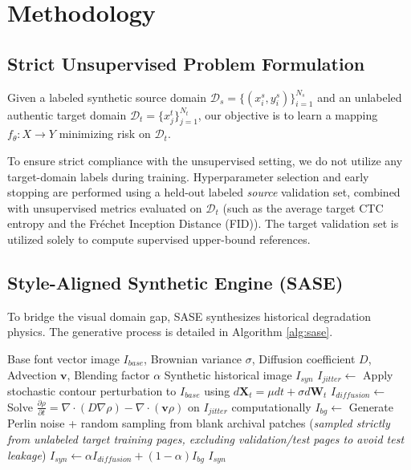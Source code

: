 \documentclass[11pt]{article}
\begin{document}
\section{Methodology}

\subsection{Strict Unsupervised Problem Formulation}
Given a labeled synthetic source domain $\mathcal{D}_s = \{(x_i^s, y_i^s)\}_{i=1}^{N_s}$ and an unlabeled authentic target domain $\mathcal{D}_t = \{x_j^t\}_{j=1}^{N_t}$, our objective is to learn a mapping $f_{\theta}: X \rightarrow Y$ minimizing risk on $\mathcal{D}_t$. 

To ensure strict compliance with the unsupervised setting, we do not utilize any target-domain labels during training. Hyperparameter selection and early stopping are performed using a held-out labeled \textit{source} validation set, combined with unsupervised metrics evaluated on $\mathcal{D}_t$ (such as the average target CTC entropy and the Fr\'echet Inception Distance (FID)). The target validation set is utilized solely to compute supervised upper-bound references.

\subsection{Style-Aligned Synthetic Engine (SASE)}
To bridge the visual domain gap, SASE synthesizes historical degradation physics. The generative process is detailed in Algorithm \ref{alg:sase}.

\begin{algorithm}[h]
\caption{SASE: Physics-Based Data Generation}
\label{alg:sase}
\begin{algorithmic}[1]
\Require Base font vector image $I_{base}$, Brownian variance $\sigma$, Diffusion coefficient $D$, Advection $\mathbf{v}$, Blending factor $\alpha$
\Ensure Synthetic historical image $I_{syn}$
\State $I_{jitter} \leftarrow$ Apply stochastic contour perturbation to $I_{base}$ using $d\mathbf{X}_t = \mu dt + \sigma d\mathbf{W}_t$
\State $I_{diffusion} \leftarrow$ Solve $\frac{\partial \rho}{\partial t} = \nabla \cdot (D \nabla \rho) - \nabla \cdot (\mathbf{v} \rho)$ on $I_{jitter}$ computationally
\State $I_{bg} \leftarrow$ Generate Perlin noise + random sampling from blank archival patches (\textit{sampled strictly from unlabeled target training pages, excluding validation/test pages to avoid test leakage})
\State $I_{syn} \leftarrow \alpha I_{diffusion} + (1-\alpha) I_{bg}$
\State \Return $I_{syn}$
\end{algorithmic}
\end{algorithm}
\end{document}
